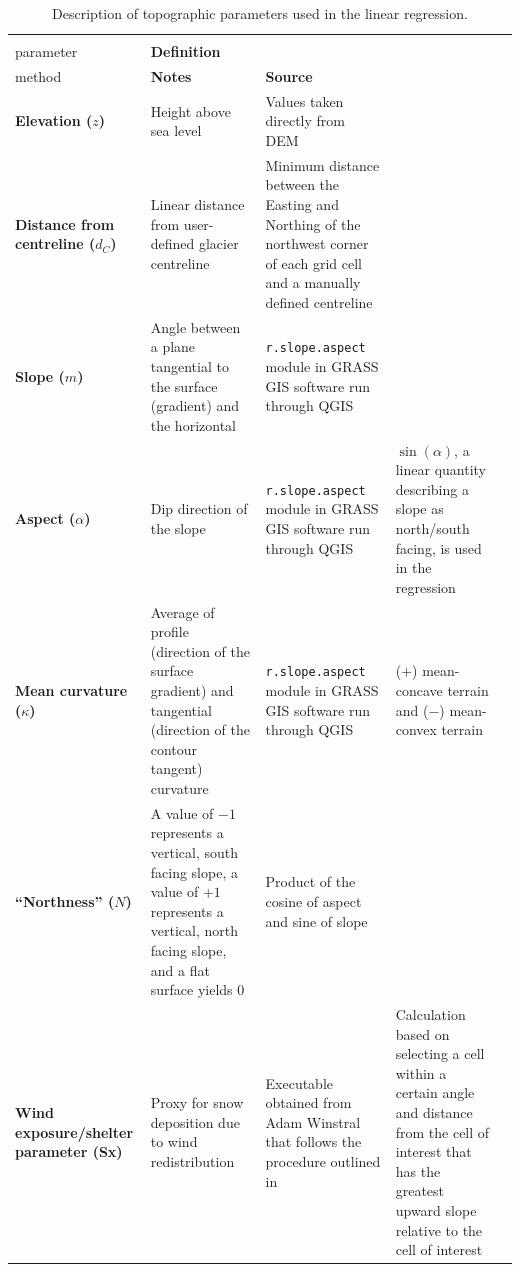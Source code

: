 \documentclass[onecolumn, letterpaper]{igs}
\begin{document}
\begin{landscape}
\begin{table}[H]
\begin{threeparttable}
\caption{Description of topographic parameters used in the linear regression.}
\label{tab:TopoParams}
\begin{tabularx}{24cm}{XXXXX}

\midrule
\textbf{\begin{tabular}[c]{@{}l@{}}Topographic\\ parameter\end{tabular}} & \textbf{Definition} & \textbf{\begin{tabular}[c]{@{}l@{}}Calculation \\ method\end{tabular}} & \textbf{Notes} & \textbf{Source} \\ \midrule
\textbf{Elevation ($z$)} & Height above sea level & Values taken directly from DEM &  &  \\ \midrule
\textbf{Distance from centreline ($d_C$)} & Linear distance from user-defined glacier centreline & Minimum distance between the Easting and Northing of the northwest corner of each grid cell and a manually defined centreline &  &  \\ \midrule
\textbf{Slope ($m$)} & Angle between a plane tangential to the surface (gradient) and the horizontal & \texttt{r.slope.aspect} module in GRASS GIS software run through QGIS &  & \cite{Mitavsova1993, Hofierka2009, Olaya2009} \\ \midrule
\textbf{Aspect ($\alpha$)} & Dip direction of the slope & \texttt{r.slope.aspect} module in GRASS GIS software run through QGIS & $\sin(\alpha)$, a linear quantity describing a slope as north/south facing, is used in the regression & \cite{Mitavsova1993, Hofierka2009, Olaya2009} \\ \midrule
\textbf{Mean curvature ($\kappa$)} & Average of profile (direction of the surface gradient) and tangential (direction of the contour tangent) curvature & \texttt{r.slope.aspect} module in GRASS GIS software run through QGIS & ($+$) mean-concave terrain and ($-$) mean-convex terrain & \cite{Mitavsova1993, Hofierka2009, Olaya2009} \\ \midrule
\textbf{``Northness'' ($N$)} & A value of $-1$ represents a vertical, south facing slope, a value of $+1$ represents a vertical, north facing slope, and a flat surface yields 0 & Product of the cosine of aspect and sine of slope &  & \citep{Molotch2005} \\ \midrule
\textbf{Wind exposure/shelter parameter (Sx)} & Proxy for snow deposition due to wind redistribution & Executable obtained from Adam Winstral that follows the procedure outlined in \cite{Winstral2002} & Calculation based on selecting a cell within a certain angle and distance from the cell of interest that has the greatest upward slope relative to the cell of interest & \citep{Winstral2002}
\end{tabularx}
\end{threeparttable}
\end{table}
\end{landscape}
\end{document}
